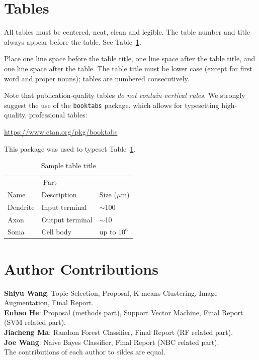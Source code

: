 \documentclass[final]{article}
\begin{document}
\section{Tables}


All tables must be centered, neat, clean and legible.  The table number and
title always appear before the table.  See Table~\ref{sample-table}.


Place one line space before the table title, one line space after the
table title, and one line space after the table. The table title must
be lower case (except for first word and proper nouns); tables are
numbered consecutively.


Note that publication-quality tables \emph{do not contain vertical rules.} We
strongly suggest the use of the \verb+booktabs+ package, which allows for
typesetting high-quality, professional tables:
\begin{center}
    \url{https://www.ctan.org/pkg/booktabs}
\end{center}
This package was used to typeset Table~\ref{sample-table}.


\begin{table}[H]
    \caption{Sample table title}
    \label{sample-table}
    \centering
    \begin{tabular}{lll}
        \toprule
        \multicolumn{2}{c}{Part}                   \\
        \cmidrule(r){1-2}
        Name     & Description     & Size ($\mu$m) \\
        \midrule
        Dendrite & Input terminal  & $\sim$100     \\
        Axon     & Output terminal & $\sim$10      \\
        Soma     & Cell body       & up to $10^6$  \\
        \bottomrule
    \end{tabular}
\end{table}
\newpage


\section{Author Contributions}
\textbf{Shiyu Wang}: Topic Selection, Proposal, K-means Clustering, Image Augmentation, Final Report. \\
\textbf{Enhao He}: Proposal (methods part), Support Vector Machine, Final Report (SVM related part). \\
\textbf{Jiacheng Ma}: Random Forest Classifier, Final Report (RF related part). \\
\textbf{Joe Wang}: Naive Bayes Classifier, Final Report (NBC related part). \\
The contributions of each author to sildes are equal. 
\newpage
\end{document}

